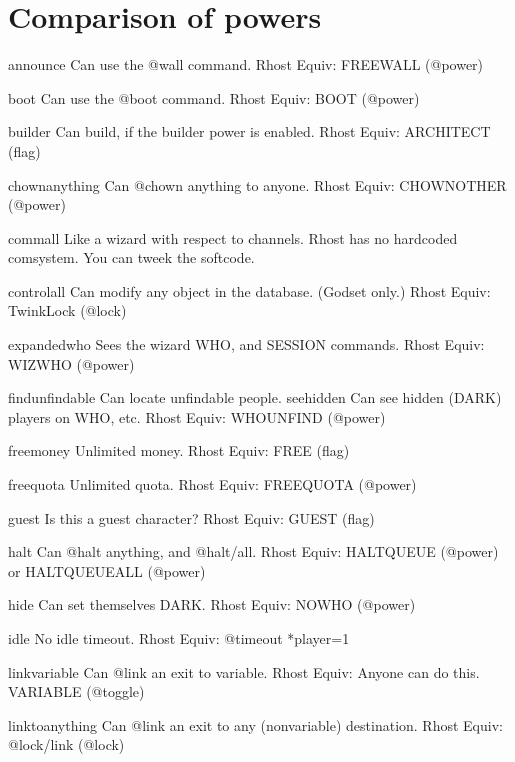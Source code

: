 \documentclass[letterpaper,10pt,english]{sphinxmanual}
\begin{document}
\chapter{Comparison of powers}
\label{\detokenize{powers:comparison-of-powers}}\label{\detokenize{powers::doc}}
\begin{sphinxVerbatim}[commandchars=\\\{\}]
announce              Can use the @wall command.
Rhost Equiv: \PYGZhy{} FREE\PYGZus{}WALL (@power)

boot                  Can use the @boot command.
Rhost Equiv: BOOT (@power)

builder               Can build, if the builder power is enabled.
Rhost Equiv: ARCHITECT (flag)

chown\PYGZus{}anything        Can @chown anything to anyone.
Rhost Equiv: CHOWN\PYGZus{}OTHER (@power)

comm\PYGZus{}all              Like a wizard with respect to channels.
Rhost has no hardcoded comsystem.  You can tweek the softcode.

control\PYGZus{}all           Can modify any object in the database. (God\PYGZhy{}set only.)
Rhost Equiv: TwinkLock (@lock)

expanded\PYGZus{}who          Sees the wizard WHO, and SESSION commands.
Rhost Equiv: WIZ\PYGZus{}WHO (@power)

find\PYGZus{}unfindable       Can locate unfindable people.
see\PYGZus{}hidden            Can see hidden (DARK) players on WHO, etc.
Rhost Equiv: WHO\PYGZus{}UNFIND (@power)

free\PYGZus{}money            Unlimited money.
Rhost Equiv: FREE (flag)

free\PYGZus{}quota            Unlimited quota.
Rhost Equiv: FREE\PYGZus{}QUOTA (@power)

guest                 Is this a guest character?
Rhost Equiv: GUEST (flag)

halt                  Can @halt anything, and @halt/all.
Rhost Equiv: HALT\PYGZus{}QUEUE (@power) or HALT\PYGZus{}QUEUE\PYGZus{}ALL (@power)

hide                  Can set themselves DARK.
Rhost Equiv: NOWHO (@power)

idle                  No idle timeout.
Rhost Equiv: @timeout \PYGZbs{}*player=\PYGZhy{}1

link\PYGZus{}variable         Can @link an exit to \PYGZdq{}variable\PYGZdq{}.
Rhost Equiv: Anyone can do this.  VARIABLE (@toggle)

link\PYGZus{}to\PYGZus{}anything      Can @link an exit to any (non\PYGZhy{}variable) destination.
Rhost Equiv: @lock/link (@lock)


\end{sphinxVerbatim}
\end{document}
